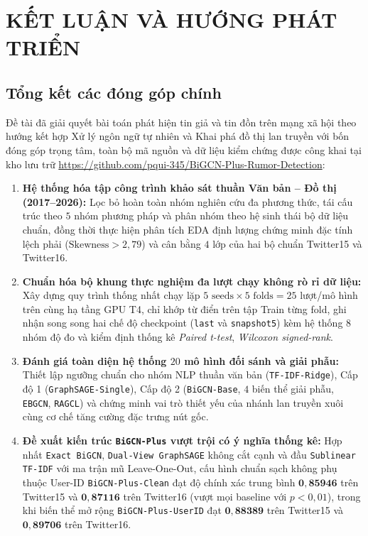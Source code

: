 \documentclass[11pt,a4paper]{extreport}
\begin{document}
\chapter{KẾT LUẬN VÀ HƯỚNG PHÁT TRIỂN}

\section{Tổng kết các đóng góp chính}

Đề tài đã giải quyết bài toán phát hiện tin giả và tin đồn trên mạng xã hội theo hướng kết hợp Xử lý ngôn ngữ tự nhiên và Khai phá đồ thị lan truyền với bốn đóng góp trọng tâm, toàn bộ mã nguồn và dữ liệu kiểm chứng được công khai tại kho lưu trữ \url{https://github.com/pqui-345/BiGCN-Plus-Rumor-Detection}:
\begin{enumerate}
    \item \textbf{Hệ thống hóa tập công trình khảo sát thuần Văn bản -- Đồ thị (2017--2026):} Lọc bỏ hoàn toàn nhóm nghiên cứu đa phương thức, tái cấu trúc theo $5$ nhóm phương pháp và phân nhóm theo hệ sinh thái bộ dữ liệu chuẩn, đồng thời thực hiện phân tích EDA định lượng chứng minh đặc tính lệch phải ($\text{Skewness} > 2{,}79$) và cân bằng $4$ lớp của hai bộ chuẩn Twitter15 và Twitter16.
    \item \textbf{Chuẩn hóa bộ khung thực nghiệm đa lượt chạy không rò rỉ dữ liệu:} Xây dựng quy trình thống nhất chạy lặp $5\text{ seeds} \times 5\text{ folds} = 25$ lượt/mô hình trên cùng hạ tầng GPU T4, chỉ khớp từ điển trên tập Train từng fold, ghi nhận song song hai chế độ checkpoint (\texttt{last} và \texttt{snapshot5}) kèm hệ thống $8$ nhóm độ đo và kiểm định thống kê \textit{Paired t-test}, \textit{Wilcoxon signed-rank}.
    \item \textbf{Đánh giá toàn diện hệ thống $20$ mô hình đối sánh và giải phẫu:} Thiết lập ngưỡng chuẩn cho nhóm NLP thuần văn bản (\texttt{TF-IDF-Ridge}), Cấp độ 1 (\texttt{GraphSAGE-Single}), Cấp độ 2 (\texttt{BiGCN-Base}, $4$ biến thể giải phẫu, \texttt{EBGCN}, \texttt{RAGCL}) và chứng minh vai trò thiết yếu của nhánh lan truyền xuôi cùng cơ chế tăng cường đặc trưng nút gốc.
    \item \textbf{Đề xuất kiến trúc \texttt{BiGCN-Plus} vượt trội có ý nghĩa thống kê:} Hợp nhất \texttt{Exact BiGCN}, \texttt{Dual-View GraphSAGE} không cắt cạnh và đầu \texttt{Sublinear TF-IDF} với ma trận mũ Leave-One-Out, cấu hình chuẩn sạch không phụ thuộc User-ID \texttt{BiGCN-Plus-Clean} đạt độ chính xác trung bình $\mathbf{0{,}85946}$ trên Twitter15 và $\mathbf{0{,}87116}$ trên Twitter16 (vượt mọi baseline với $p < 0{,}01$), trong khi biến thể mở rộng \texttt{BiGCN-Plus-UserID} đạt $\mathbf{0{,}88389}$ trên Twitter15 và $\mathbf{0{,}89706}$ trên Twitter16.
\end{enumerate}
\end{document}

